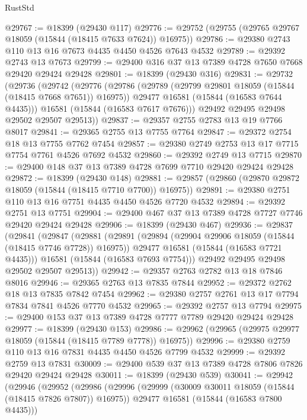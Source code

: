 \begin{lexlean}{RustStd}
\begin{coremodule}
@29767 := @18399 (@29430 @117)
@29776 := @29752 (@29755 (@29765 @29767 @18059 (@15844 (@18415 @7633 @7624)) @16975))
@29786 := @29380 @2743 @110 @13 @16 @7673 @4435 @4450 @4526 @7643 @4532
@29789 := @29392 @2743 @13 @7673
@29799 := @29400 @316 @37 @13 @7389 @4728 @7650 @7668 @29420 @29424 @29428
@29801 := @18399 (@29430 @316)
@29831 := @29732
    (@29736
      (@29742
        (@29776
          (@29786
            (@29789 (@29799 @29801 @18059 (@15844 (@18415 @7668 @7651)) @16975))
            @29477
            @16581
            (@15844 (@16583 @7644 @4435)))
          @16581
          (@15844 (@16583 @7617 @7676)))
        @29492
        @29495
        @29498
        @29502
        @29507
        @29513))
@29837 := @29357 @2755 @2783 @13 @19 @7766 @8017
@29841 := @29365 @2755 @13 @7755 @7764
@29847 := @29372 @2754 @18 @13 @7755 @7762 @7454
@29857 := @29380 @2749 @2753 @13 @17 @7715 @7754 @7761 @4526 @7692 @4532
@29860 := @29392 @2749 @13 @7715
@29870 := @29400 @148 @37 @13 @7389 @4728 @7699 @7710 @29420 @29424 @29428
@29872 := @18399 (@29430 @148)
@29881 := @29857 (@29860 (@29870 @29872 @18059 (@15844 (@18415 @7710 @7700)) @16975))
@29891 := @29380 @2751 @110 @13 @16 @7751 @4435 @4450 @4526 @7720 @4532
@29894 := @29392 @2751 @13 @7751
@29904 := @29400 @467 @37 @13 @7389 @4728 @7727 @7746 @29420 @29424 @29428
@29906 := @18399 (@29430 @467)
@29936 := @29837
    (@29841
      (@29847
        (@29881
          (@29891
            (@29894 (@29904 @29906 @18059 (@15844 (@18415 @7746 @7728)) @16975))
            @29477
            @16581
            (@15844 (@16583 @7721 @4435)))
          @16581
          (@15844 (@16583 @7693 @7754)))
        @29492
        @29495
        @29498
        @29502
        @29507
        @29513))
@29942 := @29357 @2763 @2782 @13 @18 @7846 @8016
@29946 := @29365 @2763 @13 @7835 @7844
@29952 := @29372 @2762 @18 @13 @7835 @7842 @7454
@29962 := @29380 @2757 @2761 @13 @17 @7794 @7834 @7841 @4526 @7770 @4532
@29965 := @29392 @2757 @13 @7794
@29975 := @29400 @153 @37 @13 @7389 @4728 @7777 @7789 @29420 @29424 @29428
@29977 := @18399 (@29430 @153)
@29986 := @29962 (@29965 (@29975 @29977 @18059 (@15844 (@18415 @7789 @7778)) @16975))
@29996 := @29380 @2759 @110 @13 @16 @7831 @4435 @4450 @4526 @7799 @4532
@29999 := @29392 @2759 @13 @7831
@30009 := @29400 @539 @37 @13 @7389 @4728 @7806 @7826 @29420 @29424 @29428
@30011 := @18399 (@29430 @539)
@30041 := @29942
    (@29946
      (@29952
        (@29986
          (@29996
            (@29999 (@30009 @30011 @18059 (@15844 (@18415 @7826 @7807)) @16975))
            @29477
            @16581
            (@15844 (@16583 @7800 @4435)))

\end{coremodule}
\end{lexlean}
